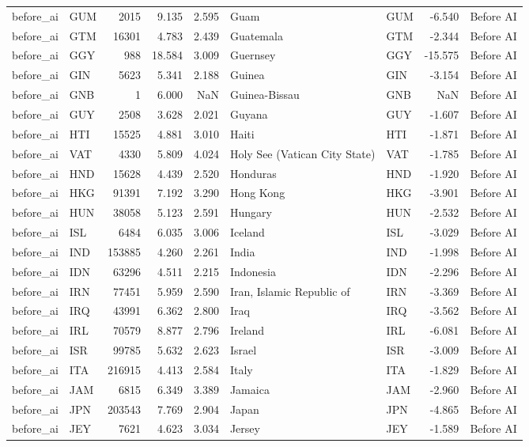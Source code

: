 \begin{tabular}{llrrrllrl}
before\_ai & GUM & 2015 & 9.135 & 2.595 & Guam & GUM & -6.540 & Before AI \\
before\_ai & GTM & 16301 & 4.783 & 2.439 & Guatemala & GTM & -2.344 & Before AI \\
before\_ai & GGY & 988 & 18.584 & 3.009 & Guernsey & GGY & -15.575 & Before AI \\
before\_ai & GIN & 5623 & 5.341 & 2.188 & Guinea & GIN & -3.154 & Before AI \\
before\_ai & GNB & 1 & 6.000 & NaN & Guinea-Bissau & GNB & NaN & Before AI \\
before\_ai & GUY & 2508 & 3.628 & 2.021 & Guyana & GUY & -1.607 & Before AI \\
before\_ai & HTI & 15525 & 4.881 & 3.010 & Haiti & HTI & -1.871 & Before AI \\
before\_ai & VAT & 4330 & 5.809 & 4.024 & Holy See (Vatican City State) & VAT & -1.785 & Before AI \\
before\_ai & HND & 15628 & 4.439 & 2.520 & Honduras & HND & -1.920 & Before AI \\
before\_ai & HKG & 91391 & 7.192 & 3.290 & Hong Kong & HKG & -3.901 & Before AI \\
before\_ai & HUN & 38058 & 5.123 & 2.591 & Hungary & HUN & -2.532 & Before AI \\
before\_ai & ISL & 6484 & 6.035 & 3.006 & Iceland & ISL & -3.029 & Before AI \\
before\_ai & IND & 153885 & 4.260 & 2.261 & India & IND & -1.998 & Before AI \\
before\_ai & IDN & 63296 & 4.511 & 2.215 & Indonesia & IDN & -2.296 & Before AI \\
before\_ai & IRN & 77451 & 5.959 & 2.590 & Iran, Islamic Republic of & IRN & -3.369 & Before AI \\
before\_ai & IRQ & 43991 & 6.362 & 2.800 & Iraq & IRQ & -3.562 & Before AI \\
before\_ai & IRL & 70579 & 8.877 & 2.796 & Ireland & IRL & -6.081 & Before AI \\
before\_ai & ISR & 99785 & 5.632 & 2.623 & Israel & ISR & -3.009 & Before AI \\
before\_ai & ITA & 216915 & 4.413 & 2.584 & Italy & ITA & -1.829 & Before AI \\
before\_ai & JAM & 6815 & 6.349 & 3.389 & Jamaica & JAM & -2.960 & Before AI \\
before\_ai & JPN & 203543 & 7.769 & 2.904 & Japan & JPN & -4.865 & Before AI \\
before\_ai & JEY & 7621 & 4.623 & 3.034 & Jersey & JEY & -1.589 & Before AI \\

\end{tabular}
